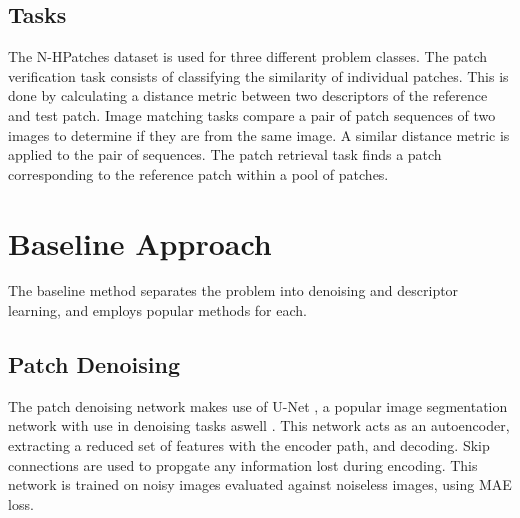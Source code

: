 \documentclass[10pt,twocolumn,letterpaper]{article}
\begin{document}
\subsection{Tasks}
\vspace{-0.2cm}
The N-HPatches dataset is used for three different problem classes. 
The patch verification task consists of classifying the similarity of individual patches. This is done by calculating a distance metric between two descriptors of the reference and test patch.
Image matching tasks compare a pair of patch sequences of two images to determine if they are from the same image. A similar distance metric is applied to the pair of sequences.
The patch retrieval task finds a patch corresponding to the reference patch within a pool of patches.

\vspace{-0.4cm}
\section{Baseline Approach}
\vspace{-0.2cm}

The baseline method separates the problem into denoising and descriptor learning, and employs popular methods for each.

\vspace{-0.2cm}
\subsection{Patch Denoising}
\vspace{-0.2cm}
The patch denoising network makes use of U-Net \cite{RonnebergerFB15}, a popular image segmentation network with use in denoising tasks aswell \cite{GraisP17}. This network
acts as an autoencoder, extracting a reduced set of features with the encoder path, and decoding. Skip connections are used to propgate any information lost during encoding. 
This network is trained on noisy images evaluated against noiseless images, using MAE loss. 

\end{document}
